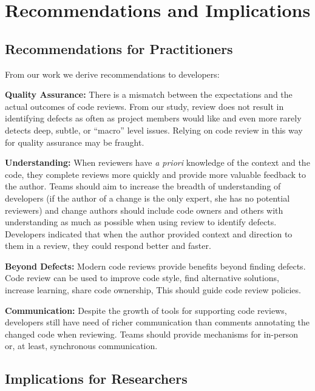 
\section{Recommendations and Implications} \label{sec:implications}


\subsection{Recommendations for Practitioners}

From our work we derive recommendations to developers:

\textbf{Quality Assurance:} There is a mismatch between the expectations and the actual outcomes of code reviews. From our study, review does not result in identifying defects as often as project members would like and even more rarely detects deep, subtle, or ``macro'' level issues. Relying on code review in this way for quality assurance may be fraught.

\textbf{Understanding:} When reviewers have \emph{a priori} knowledge of the context and the code, they complete reviews more quickly and provide more valuable feedback to the author. Teams should aim to increase the breadth of understanding of developers (if the author of a change is the only expert, she has no potential reviewers) and change authors should include code owners and others with understanding as much as possible when using review to identify defects. Developers indicated that when the author provided context and direction to them in a review, they could respond better and faster.

\textbf{Beyond Defects:} Modern code reviews provide benefits beyond finding defects. Code review can be used to improve code style, find alternative solutions, increase learning, share code ownership, \etc This should guide code review policies.

\textbf{Communication:} Despite the growth of tools for supporting code reviews, developers still have need of richer communication than comments annotating the changed code when reviewing. Teams should provide mechanisms for in-person or, at least, synchronous communication.


\subsection{Implications for Researchers}

